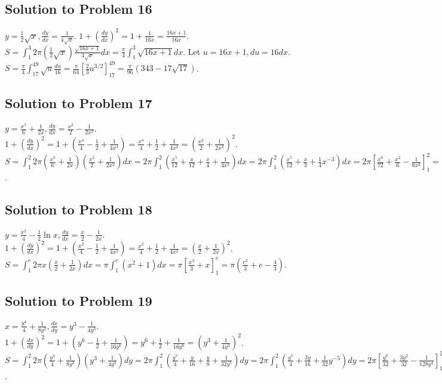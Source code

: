 \documentclass[12pt]{article}
\begin{document}
\subsection*{Solution to Problem 16}
$y=\frac{1}{2}\sqrt{x}, \frac{dy}{dx}=\frac{1}{4\sqrt{x}}$. $1+(\frac{dy}{dx})^2=1+\frac{1}{16x}=\frac{16x+1}{16x}$.
$S=\int_1^3 2\pi (\frac{1}{2}\sqrt{x}) \frac{\sqrt{16x+1}}{4\sqrt{x}} dx = \frac{\pi}{4} \int_1^3 \sqrt{16x+1} dx$.
Let $u=16x+1, du=16dx$. $S=\frac{\pi}{4}\int_{17}^{49} \sqrt{u}\frac{du}{16} = \frac{\pi}{64}[\frac{2}{3}u^{3/2}]_{17}^{49} = \frac{\pi}{96}(343-17\sqrt{17})$.

\subsection*{Solution to Problem 17}
$y=\frac{x^3}{6}+\frac{1}{2x}, \frac{dy}{dx}=\frac{x^2}{2}-\frac{1}{2x^2}$. $1+(\frac{dy}{dx})^2 = 1+(\frac{x^4}{4}-\frac{1}{2}+\frac{1}{4x^4}) = \frac{x^4}{4}+\frac{1}{2}+\frac{1}{4x^4} = (\frac{x^2}{2}+\frac{1}{2x^2})^2$.
$S=\int_1^2 2\pi (\frac{x^3}{6}+\frac{1}{2x})(\frac{x^2}{2}+\frac{1}{2x^2})dx = 2\pi\int_1^2 (\frac{x^5}{12}+\frac{x}{12}+\frac{x}{4}+\frac{1}{4x^3})dx = 2\pi\int_1^2 (\frac{x^5}{12}+\frac{x}{3}+\frac{1}{4}x^{-3})dx = 2\pi[\frac{x^6}{72}+\frac{x^2}{6}-\frac{1}{8x^2}]_1^2 = \frac{47\pi}{36}$.

\subsection*{Solution to Problem 18}
$y=\frac{x^2}{4}-\frac{1}{2}\ln x, \frac{dy}{dx}=\frac{x}{2}-\frac{1}{2x}$. $1+(\frac{dy}{dx})^2 = 1+(\frac{x^2}{4}-\frac{1}{2}+\frac{1}{4x^2}) = \frac{x^2}{4}+\frac{1}{2}+\frac{1}{4x^2} = (\frac{x}{2}+\frac{1}{2x})^2$.
$S=\int_1^e 2\pi x (\frac{x}{2}+\frac{1}{2x}) dx = \pi \int_1^e (x^2+1)dx = \pi[\frac{x^3}{3}+x]_1^e = \pi(\frac{e^3}{3}+e - \frac{4}{3})$.

\subsection*{Solution to Problem 19}
$x=\frac{y^4}{4}+\frac{1}{8y^2}, \frac{dx}{dy}=y^3-\frac{1}{4y^3}$. $1+(\frac{dx}{dy})^2=1+(y^6-\frac{1}{2}+\frac{1}{16y^6})=y^6+\frac{1}{2}+\frac{1}{16y^6}=(y^3+\frac{1}{4y^3})^2$.
$S=\int_1^2 2\pi(\frac{y^4}{4}+\frac{1}{8y^2})(y^3+\frac{1}{4y^3})dy = 2\pi \int_1^2 (\frac{y^7}{4}+\frac{y}{16}+\frac{y}{8}+\frac{1}{32y^5})dy = 2\pi \int_1^2 (\frac{y^7}{4}+\frac{3y}{16}+\frac{1}{32}y^{-5})dy = 2\pi[\frac{y^8}{32}+\frac{3y^2}{32}-\frac{1}{128y^4}]_1^2 = \frac{255\pi}{128}$.
\end{document}
